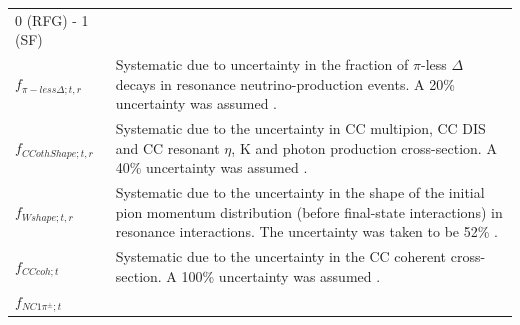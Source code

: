 {\begin{longtable}{p{1.65cm}l}
{    0 (RFG) - 1 (SF)
    \vspace{0.2cm}
  }
\\
  \parbox{0.15\textwidth}
  {
    \vspace{0.2cm}
    $f_{\pi-less\Delta; t, r}$
    \vspace{0.2cm}
  }
&
  \parbox{0.81\textwidth}
  {
    \vspace{0.2cm}
    Systematic due to uncertainty in the fraction of $\pi$-less $\Delta$ decays in resonance neutrino-production events.
    A 20\% uncertainty was assumed \cite{MoreNIWGErr113}.
    \vspace{0.2cm}
  }
\\
  \parbox{0.15\textwidth}
  {
    \vspace{0.2cm}
    $f_{CCothShape; t, r}$
    \vspace{0.2cm}
  }
&
  \parbox{0.81\textwidth}
  {
    \vspace{0.2cm}
    Systematic due to the uncertainty in CC multipion, CC DIS and CC resonant $\eta$, K and photon production cross-section.
    A 40\% uncertainty was assumed \cite{MoreNIWGErr113}.    
    \vspace{0.2cm}
  }
\\
  \parbox{0.15\textwidth}
  {
    \vspace{0.2cm}
    $f_{Wshape; t, r}$
    \vspace{0.2cm}
  }
&
  \parbox{0.81\textwidth}
  {
    \vspace{0.2cm}
    Systematic due to the uncertainty in the shape of the 
    initial pion momentum distribution (before final-state interactions) in resonance interactions. 
    The uncertainty was taken to be 52\% \cite{MoreNIWGErr113}. \\
    \vspace{0.2cm}
  }
\\
  \parbox{0.15\textwidth}
  {
    \vspace{0.2cm}
    $f_{CCcoh; t}$
    \vspace{0.2cm}
  }
&
  \parbox{0.81\textwidth}
  {
    \vspace{0.2cm}
    Systematic due to the uncertainty in the CC coherent cross-section.
    A 100\% uncertainty was assumed \cite{MoreNIWGErr113}.
    \vspace{0.2cm}
  }
\\
  \parbox{0.15\textwidth}
  {
    \vspace{0.2cm}
    $f_{NC1\pi^\pm; t}$
    \vspace{0.2cm}
  }
&
  \parbox{0.81\textwidth}
  {
    \vspace{0.2cm}
}
\end{longtable}}
